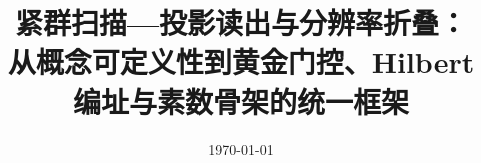 \documentclass[11pt,letterpaper]{ctexart}
\title{紧群扫描—投影读出与分辨率折叠：\\\large 从概念可定义性到黄金门控、Hilbert 编址与素数骨架的统一框架}
\author{}
\date{\today}
\begin{document}
\maketitle














\FloatBarrier
\appendix





\FloatBarrier

\end{document}
